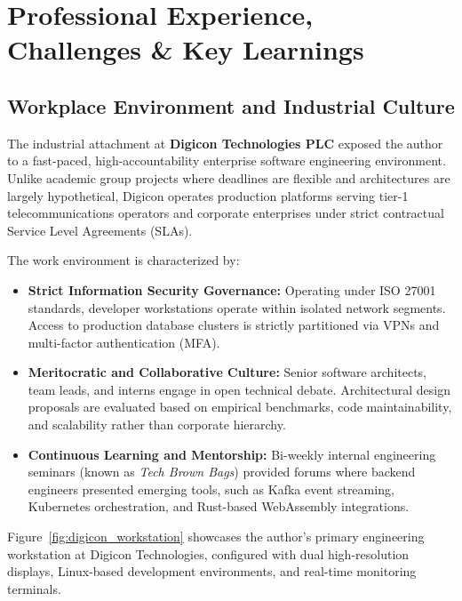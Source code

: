 \chapter{Professional Experience, Challenges \& Key Learnings}
\label{ch:professional_experience}

\section{Workplace Environment and Industrial Culture}
\label{sec:exp_workplace}

The industrial attachment at \textbf{Digicon Technologies PLC} exposed the author to a fast-paced, high-accountability enterprise software engineering environment. Unlike academic group projects where deadlines are flexible and architectures are largely hypothetical, Digicon operates production platforms serving tier-1 telecommunications operators and corporate enterprises under strict contractual Service Level Agreements (SLAs).

The work environment is characterized by:
\begin{itemize}
    \item \textbf{Strict Information Security Governance:} Operating under ISO 27001 standards, developer workstations operate within isolated network segments. Access to production database clusters is strictly partitioned via VPNs and multi-factor authentication (MFA).
    \item \textbf{Meritocratic and Collaborative Culture:} Senior software architects, team leads, and interns engage in open technical debate. Architectural design proposals are evaluated based on empirical benchmarks, code maintainability, and scalability rather than corporate hierarchy.
    \item \textbf{Continuous Learning and Mentorship:} Bi-weekly internal engineering seminars (known as \textit{Tech Brown Bags}) provided forums where backend engineers presented emerging tools, such as Kafka event streaming, Kubernetes orchestration, and Rust-based WebAssembly integrations.
\end{itemize}

Figure~\ref{fig:digicon_workstation} showcases the author's primary engineering workstation at Digicon Technologies, configured with dual high-resolution displays, Linux-based development environments, and real-time monitoring terminals.

